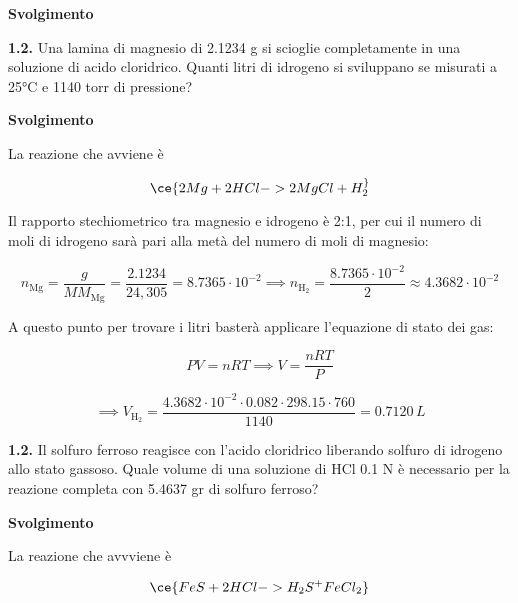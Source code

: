 \vspace{0.2cm}\large\textbf{Svolgimento}\normalsize

\vspace{0.2cm}

\vspace{0.2cm}\textbf{1.2.} Una lamina di magnesio di 2.1234 g si scioglie completamente in una soluzione di acido cloridrico. Quanti litri di idrogeno si sviluppano se misurati a 25°C e 1140 torr di pressione?

\vspace{0.2cm}\large\textbf{Svolgimento}\normalsize

\vspace{0.2cm}La reazione che avviene è

$$\ce{2Mg + 2HCl -> 2MgCl + H_2 ^}$$

Il rapporto stechiometrico tra magnesio e idrogeno è 2:1, per cui il numero di moli di idrogeno sarà pari alla metà del numero di moli di magnesio:

$$n_{\text{Mg}}=\frac{g}{MM_{\text{Mg}}}=\frac{2.1234}{24,305}=8.7365 \cdot 10^{-2} \implies n_{\text{H}_2}=\frac{8.7365 \cdot 10^{-2}}{2}\approx 4.3682 \cdot 10^{-2}$$

A questo punto per trovare i litri basterà applicare l'equazione di stato dei gas:

$$PV=nRT \implies V=\frac{nRT}{P}$$

$$\implies V_{\text{H}_2}=\frac{4.3682 \cdot 10^{-2} \cdot 0.082 \cdot 298.15 \cdot 760}{1140}=0.7120\,L$$

\vspace{0.2cm}\textbf{1.2.} Il solfuro ferroso reagisce con l'acido cloridrico liberando solfuro di idrogeno allo stato gassoso. Quale volume di una soluzione di HCl 0.1 N è necessario per la reazione completa con 5.4637 gr di solfuro ferroso?

\vspace{0.2cm}\large\textbf{Svolgimento}\normalsize

\vspace{0.2cm}La reazione che avvviene è

$$\ce{FeS + 2HCl -> H_2S ^ + FeCl_2}$$
